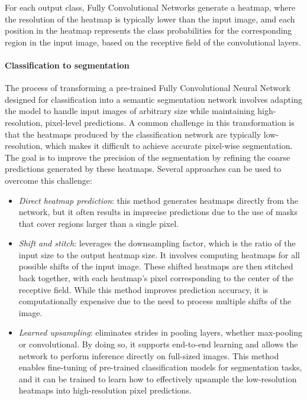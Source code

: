 For each output class, Fully Convolutional Networks generate a heatmap, where the resolution of the heatmap is typically lower than the input image, amd each position in the heatmap represents the class probabilities for the corresponding region in the input image, based on the receptive field of the convolutional layers.

\paragraph*{Classification to segmentation}
The process of transforming a pre-trained Fully Convolutional Neural Network designed for classification into a semantic segmentation network involves adapting the model to handle input images of arbitrary size while maintaining high-resolution, pixel-level predictions.
A common challenge in this transformation is that the heatmaps produced by the classification network are typically low-resolution, which makes it difficult to achieve accurate pixel-wise segmentation. 
The goal is to improve the precision of the segmentation by refining the coarse predictions generated by these heatmaps.
Several approaches can be used to overcome this challenge:
\begin{itemize}
    \item \textit{Direct heatmap prediction}: this method generates heatmaps directly from the network, but it often results in imprecise predictions due to the use of masks that cover regions larger than a single pixel.
    \item \textit{Shift and stitch}: leverages the downsampling factor, which is the ratio of the input size to the output heatmap size. 
        It involves computing heatmaps for all possible shifts of the input image. These shifted heatmaps are then stitched back together, with each heatmap's pixel corresponding to the center of the receptive field. 
        While this method improves prediction accuracy, it is computationally expensive due to the need to process multiple shifts of the image.
    \item \textit{Learned upsampling}: eliminates strides in pooling layers, whether max-pooling or convolutional. 
        By doing so, it supports end-to-end learning and allows the network to perform inference directly on full-sized images.
        This method enables fine-tuning of pre-trained classification models for segmentation tasks, and it can be trained to learn how to effectively upsample the low-resolution heatmaps into high-resolution pixel predictions.
\end{itemize}

